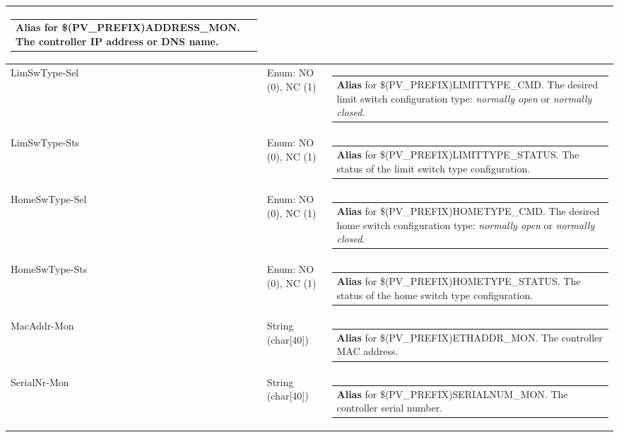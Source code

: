 \documentclass[openany]{article}
\begin{document}
\begin{longtable}{| m{4.5cm} m{2.5cm}  m{8.5cm} |}
\begin{tabular}{@{}m{6cm}@{}}
                \textbf{\color{blue} Alias} for \$(PV\_PREFIX)ADDRESS\_MON. The controller IP address or DNS name.
            \end{tabular} \hypertarget{pv:lim-sw-type}{}\\ \hline
        LimSwType-Sel & Enum: NO (0), NC (1) & \begin{tabular}{@{}m{6cm}@{}}
                \textbf{\color{blue} Alias} for \$(PV\_PREFIX)LIMITTYPE\_CMD. The desired limit switch configuration type: \emph{normally open} or \emph{normally closed}.
            \end{tabular} \hypertarget{}{}\\ \hline
        LimSwType-Sts & Enum: NO (0), NC (1) & \begin{tabular}{@{}m{6cm}@{}}
                \textbf{\color{blue} Alias} for \$(PV\_PREFIX)LIMITTYPE\_STATUS. The status of the limit switch type configuration.
            \end{tabular} \hypertarget{pv:home-sw-type}{}\\ \hline
        HomeSwType-Sel & Enum: NO (0), NC (1) & \begin{tabular}{@{}m{6cm}@{}}
                \textbf{\color{blue} Alias} for \$(PV\_PREFIX)HOMETYPE\_CMD. The desired home switch configuration type: \emph{normally open} or \emph{normally closed}.
            \end{tabular} \hypertarget{}{}\\ \hline
        HomeSwType-Sts & Enum: NO (0), NC (1) & \begin{tabular}{@{}m{6cm}@{}}
                \textbf{\color{blue} Alias} for \$(PV\_PREFIX)HOMETYPE\_STATUS. The status of the home switch type configuration.
            \end{tabular} \hypertarget{pv:mac-addr-mon}{}\\ \hline
        MacAddr-Mon & String (char[40]) & \begin{tabular}{@{}m{6cm}@{}}
                \textbf{\color{blue} Alias} for \$(PV\_PREFIX)ETHADDR\_MON. The controller MAC address.
            \end{tabular} \hypertarget{pv:serial-nr-mon}{}\\ \hline
        SerialNr-Mon & String (char[40]) & \begin{tabular}{@{}m{6cm}@{}}
                \textbf{\color{blue} Alias} for \$(PV\_PREFIX)SERIALNUM\_MON. The controller serial number.

\end{tabular}
\end{longtable}
\end{document}
